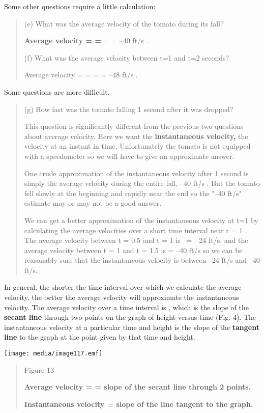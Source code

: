 Some other questions require a little calculation:

\begin{quote}
(e) What was the average velocity of the tomato during its fall?

\textbf{Average velocity = =} = = --40 ft/s .

(f) What was the average velocity between t=1 and t=2 seconds?

Average velocity = = = = --48 ft/s .
\end{quote}

Some questions are more difficult.

\begin{quote}
(g) How fast was the tomato falling 1 second after it was dropped?

This question is significantly different from the previous two questions
about average velocity. Here we want the \textbf{instantaneous
velocity,} the velocity at an instant in time. Unfortunately the tomato
is not equipped with a speedometer so we will have to give an
approximate answer.

One crude approximation of the instantaneous velocity after 1 second is
simply the average velocity during the entire fall, --40 ft/s . But the
tomato fell slowly at the beginning and rapidly near the end so the
"--40 ft/s" estimate may or may not be a good answer.

We can get a better approximation of the instantaneous velocity at t=1
by calculating the average velocities over a short time interval near t
= 1 . The average velocity between t = 0.5 and t = 1 is ~=~--24 ft/s,
and the average velocity between t = 1 and t = 1.5 is = --40 ft/s so we
can be reasonably sure that the instantaneous velocity is between --24
ft/s and --40 ft/s.
\end{quote}

In general, the shorter the time interval over which we calculate the
average velocity, the better the average velocity will approximate the
instantaneous velocity. The average velocity over a time interval is ,
which is the slope of the \textbf{secant line} through two points on the
graph of height versus time (Fig. 4). The instantaneous velocity at a
particular time and height is the slope of the \textbf{tangent line} to
the graph at the point given by that time and height.

\texttt{[image: media/image117.emf]}

\begin{quote}
Figure 13

\textbf{Average velocity = = slope of the secant line through 2 points.}

\textbf{Instantaneous velocity = slope of the line tangent to the
graph.}
\end{quote}

